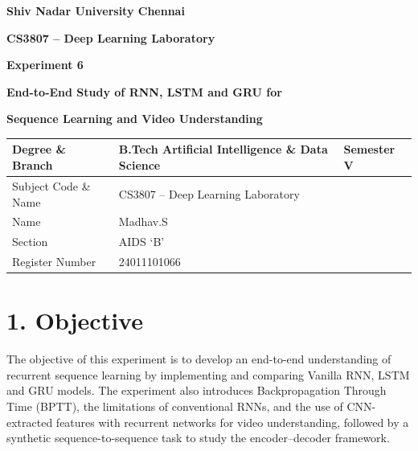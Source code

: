 \documentclass[10pt]{article}
\begin{document}

\begin{center}

{\large\textbf{Shiv Nadar University Chennai}}

\vspace{2mm}

{\normalsize\textbf{CS3807 -- Deep Learning Laboratory}}

\vspace{2mm}

{\large\textbf{Experiment 6}}

\vspace{1mm}

{\normalsize\textbf{End-to-End Study of RNN, LSTM and GRU for}}

{\normalsize\textbf{Sequence Learning and Video Understanding}}

\end{center}

\vspace{3mm}

\begin{tabular}{|p{3.4cm}|p{9.0cm}|p{1.4cm}|}
\hline
Degree \& Branch &
B.Tech Artificial Intelligence \& Data Science &
Semester V\\
\hline
Subject Code \& Name &
CS3807 -- Deep Learning Laboratory & \\
\hline
Name & Madhav.S & \\
\hline
Section & AIDS `B' & \\
\hline
Register Number & 24011101066 & \\
\hline
\end{tabular}

\section*{1. Objective}

The objective of this experiment is to develop an end-to-end understanding of
recurrent sequence learning by implementing and comparing Vanilla RNN, LSTM
and GRU models. The experiment also introduces Backpropagation Through Time
(BPTT), the limitations of conventional RNNs, and the use of CNN-extracted
features with recurrent networks for video understanding, followed by a
synthetic sequence-to-sequence task to study the encoder--decoder framework.
\end{document}
